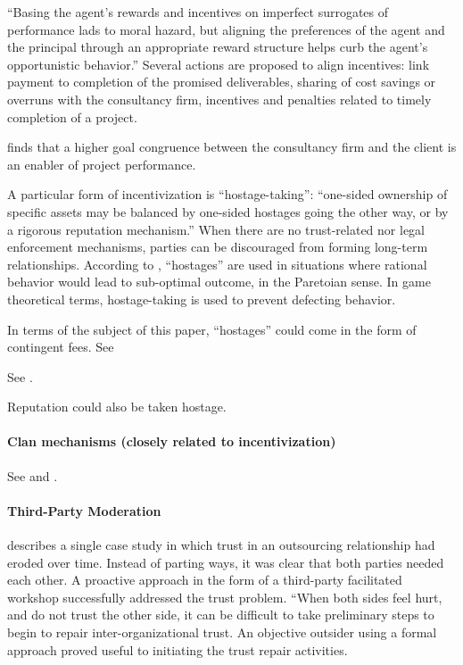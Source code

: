 \documentclass[12pt]{article}
\begin{document}
``Basing the agent's rewards and incentives on imperfect surrogates of
performance lads to moral hazard, but aligning the preferences of the
agent and the principal through an appropriate reward structure helps
curb the agent's opportunistic behavior.'' \citep[ 13-15]{basu2011}
Several actions are proposed to align incentives: link payment to
completion of the promised deliverables, sharing of cost savings or
overruns with the consultancy firm, incentives and penalties related to
timely completion of a project.

\citet[264-266]{liberatore2010} finds that a higher goal congruence
between the consultancy firm and the client is an enabler of project
performance.

A particular form of incentivization is ``hostage-taking'': ``one-sided
ownership of specific assets may be balanced by one-sided hostages going
the other way, or by a rigorous reputation mechanism.'' \citep[
924]{nooteboom2000} When there are no trust-related nor legal
enforcement mechanisms, parties can be discouraged from forming
long-term relationships. According to \citet[47-48]{werner1993},
``hostages'' are used in situations where rational behavior would lead
to sub-optimal outcome, in the Paretoian sense. In game theoretical
terms, hostage-taking is used to prevent defecting behavior.

In terms of the subject of this paper, ``hostages'' could come in the
form of contingent fees. See \citep[ 243]{clark1993}

See \citet{tosi1997}.

Reputation could also be taken hostage. \citep[ 368]{shapiro1992}

\hypertarget{clan-mechanisms-closely-related-to-incentivization}{%
\paragraph{Clan mechanisms (closely related to
incentivization)}\label{clan-mechanisms-closely-related-to-incentivization}}

See \citet[62]{aubert1996} and \citet{ouchi1980}.

\hypertarget{third-party-moderation}{%
\paragraph{Third-Party Moderation}\label{third-party-moderation}}

\citet[6-7]{babin2017} describes a single case study in which trust in
an outsourcing relationship had eroded over time. Instead of parting
ways, it was clear that both parties needed each other. A proactive
approach in the form of a third-party facilitated workshop successfully
addressed the trust problem. ``When both sides feel hurt, and do not
trust the other side, it can be difficult to take preliminary steps to
begin to repair inter-organizational trust. An objective outsider using
a formal approach proved useful to initiating the trust repair
activities.
\end{document}
